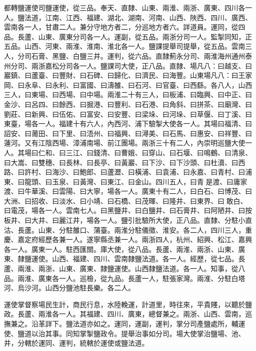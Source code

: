 \begin{pinyinscope}
都轉鹽運使司鹽運使，從三品。奉天、直隸、山東、兩淮、兩浙、廣東、四川各一人。鹽法道，江南、江西、福建、湖北、湖南、河南、山西、陜西、四川、廣西、雲南各一人，甘肅二人。兼分守地方者二，分巡地方者六。詳道員。運同，從四品。長蘆、山東、廣東分司各一人。運副，從五品。兩浙分司一人。監掣同知，正五品。山西、河東、兩淮、淮南、淮北各一人。鹽課提舉司提舉，從五品。雲南三人，分司石膏、黑鹽、白鹽三井。運判，從六品。直隸薊永分司、兩淮海州通州泰州分司、兩浙嘉松分司各一人。鹽課司大使，正八品。直隸、場凡八：曰越支、曰巖鎮、曰蘆臺、曰豐財、曰石碑、曰歸化、曰濟民、曰海豐。山東場凡八：曰王家岡、曰永阜、曰永利、曰富國、曰濤雒、曰石河、曰官臺、曰西繇。各八人，山西三人，曰東場、曰西場、曰中場。兩淮二十有三人，曰板浦、曰臨興、曰中正、曰金沙、曰呂四、曰餘西、曰掘港、曰豐利、曰石港、曰角斜、曰拼茶、曰廟灣、曰劉莊、曰新興、曰伍佑、曰富安、曰安豐、曰梁垛、曰河垛、曰草偃、曰丁溪、曰東臺，場各一人。福建十有六人，內西河、浦下驗掣大使各一人。其場曰福清、曰詔安、曰莆田、曰下里、曰浯州、曰福興、曰潯美、曰石馬、曰惠安、曰祥豐、曰蓮河。又有江陰西場、漳浦南場、前江團場。兩浙三十有二人，內崇明巡鹽大使一人。其場曰仁和、曰三江、曰錢清、曰曹娥、曰穿山、曰石堰、曰鳴鶴、曰清泉、曰大嵩、曰雙穗、曰長林、曰長亭、曰黃巖、曰下沙、曰下沙頭、曰杜瀆、曰西路、曰許村、曰海沙、曰鮑郎、曰蘆瀝、曰橫浦、曰袁浦、曰永嘉、曰青村、曰浦東、曰龍頭、曰玉泉、曰黃灣、曰東江、曰金山。四川五人，曰青是渡、曰庸家渡、曰牛華溪、曰雲陽、曰大寧，場各一人。廣東十有二人，曰白石、曰博茂、曰大洲、曰招收、曰淡水、曰小靖、曰石橋、曰茂暉、曰隆井、曰東界、曰敢白、曰電茂，場各一人。雲南七人。曰黑鹽井、曰白鹽井、曰石膏井、曰阿陋井、曰按板井、曰大井、曰麗江井，場各一人。鹽引批驗所大使，正八品。直隸、分駐小直沽、長蘆。山東、分駐雒口、蒲臺。兩淮分駐儀徵、淮安。各二人，四川三人，重慶、嘉定府經歷各兼一人。遂寧縣丞兼一人。兩浙四人，杭州、紹興、松江、嘉興各一人。廣東一人。駐西匯關。庫大使，從八品。長蘆、兩淮、兩浙、山東、廣東、隸鹽運使。山西、福建、四川、雲南隸鹽法道。各一人。經歷，從七品。長蘆、兩淮、兩浙、山東、廣東、隸鹽運使。山西隸鹽法道。各一人。知事，從八品。兩淮、廣東各一人。巡檢，從九品。長蘆一人，駐張家灣。兩淮、分駐白塔河、烏沙河。山西分鹽池駐長樂。各二人。

運使掌督察場民生計，商民行息，水陸輓運，計道里，時往來，平貴賤，以聽於鹽政。長蘆、兩淮各一人。其福建、四川、廣東，總督兼之。兩浙、山西、雲南，巡撫兼之。沿革詳下。鹽法道亦如之。運同，運副，運判，掌分司產鹽處所，輔運使、鹽道以治其事。同知掌掣鹽政令。提舉治事如分司。場大使掌治鹽場、池、井，分轄於運同、運判，統轄於運使或鹽法道。


\end{pinyinscope}
